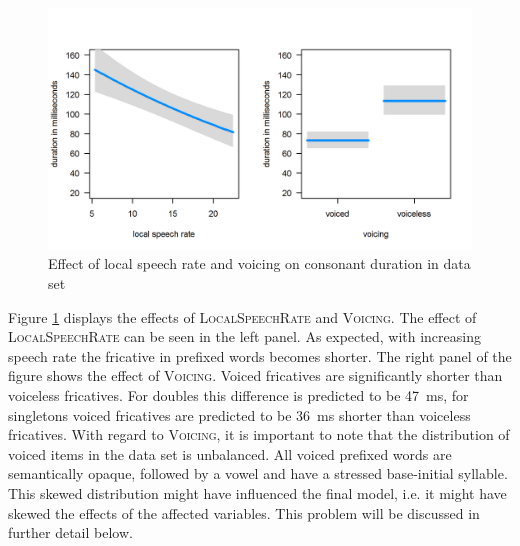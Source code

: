 \begin{figure} [t!]
	\centering
	\includegraphics[scale=.8] {images/Corpus/disModelcov.png}
	\caption{ Effect of local speech rate and voicing on consonant duration in data set}
	\label{fig:corpus covariates dis}
\end{figure}


Figure \ref{fig:corpus covariates dis} displays the effects of \textsc{LocalSpeechRate} and \textsc{Voicing}. The effect of \textsc{LocalSpeechRate} can be seen in the left panel. As expected, with increasing speech rate the fricative in prefixed words becomes shorter. 
The right panel of the figure shows the effect of \textsc{Voicing}. Voiced fricatives are significantly shorter than voiceless fricatives. For doubles this difference is predicted to be 47~ms, for singletons voiced fricatives are predicted to be 36~ms shorter than voiceless fricatives. 
With regard to \textsc{Voicing}, it is important to note that the distribution of voiced items in the data set is unbalanced. All voiced prefixed words are semantically opaque, followed by a vowel and have a stressed base-initial syllable. This skewed distribution might have influenced the final model, i.e. it might have skewed the effects of the affected variables. This problem will be discussed in further detail below.


